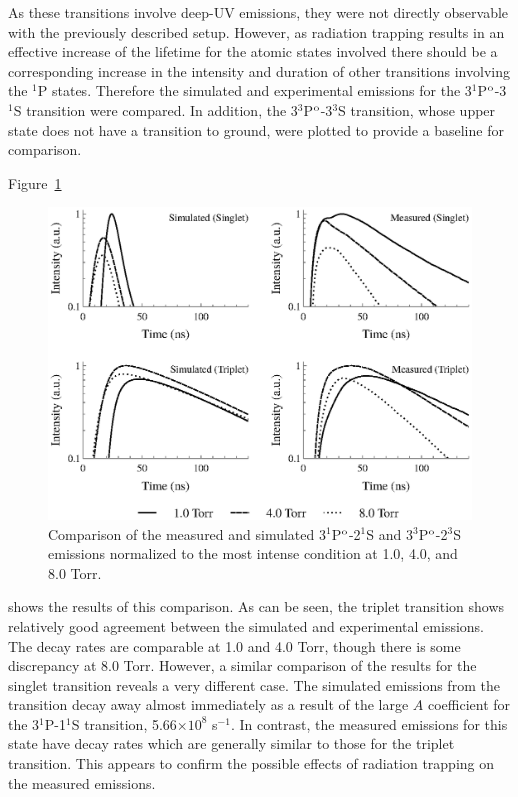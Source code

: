 As these transitions involve deep-UV emissions, they were not directly
observable with the previously described setup. However, as radiation trapping
results in an effective increase of the lifetime for the atomic states involved
there should be a corresponding increase in the intensity and duration of other
transitions involving the $^1$P states. Therefore the simulated and experimental
emissions for the 3$^1$P$^\mathrm{o}$-3$^1$S transition were compared. In addition, the
3$^3$P$^\mathrm{o}$-3$^3$S transition, whose upper state does not have a transition to
ground, were plotted to provide a baseline for comparison.

Figure~\ref{fig:trapping}
\begin{figure}
  \centering
  \includegraphics{./chapters/emissions/figures/trapping.eps}
  \caption{Comparison of the measured and simulated 3$^1$P$^\mathrm{o}$-2$^1$S and
    3$^3$P$^\mathrm{o}$-2$^3$S emissions normalized to the most intense condition at
    1.0, 4.0, and 8.0 Torr.}
  \label{fig:trapping}
\end{figure}
shows the results of this comparison. As can be seen, the triplet transition
shows relatively good agreement between the simulated and experimental
emissions. The decay rates are comparable at 1.0 and 4.0 Torr, though there is
some discrepancy at 8.0 Torr. However, a similar comparison of the results for
the singlet transition reveals a very different case. The simulated emissions
from the transition decay away almost immediately as a result of the large $A$
coefficient for the 3$^1$P-1$^1$S transition, 5.66$\times10^{8}$ s$^{-1}$. In
contrast, the measured emissions for this state have decay rates which are
generally similar to those for the triplet transition. This appears to confirm
the possible effects of radiation trapping on the measured emissions.

